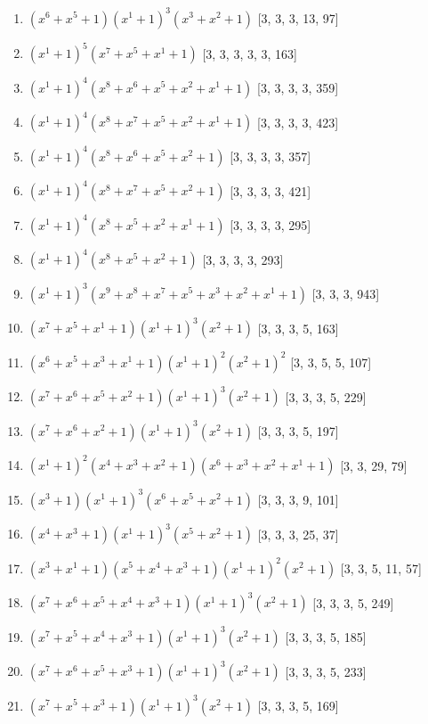\documentclass[10pt,twocolumn]{article}
\begin{document}
\begin{enumerate}
\item $(x^{6} + x^{5} + 1)(x^{1} + 1)^{3}(x^{3} + x^{2} + 1)$  [3, 3, 3, 13, 97]
\item $(x^{1} + 1)^{5}(x^{7} + x^{5} + x^{1} + 1)$  [3, 3, 3, 3, 3, 163]
\item $(x^{1} + 1)^{4}(x^{8} + x^{6} + x^{5} + x^{2} + x^{1} + 1)$  [3, 3, 3, 3, 359]
\item $(x^{1} + 1)^{4}(x^{8} + x^{7} + x^{5} + x^{2} + x^{1} + 1)$  [3, 3, 3, 3, 423]
\item $(x^{1} + 1)^{4}(x^{8} + x^{6} + x^{5} + x^{2} + 1)$  [3, 3, 3, 3, 357]
\item $(x^{1} + 1)^{4}(x^{8} + x^{7} + x^{5} + x^{2} + 1)$  [3, 3, 3, 3, 421]
\item $(x^{1} + 1)^{4}(x^{8} + x^{5} + x^{2} + x^{1} + 1)$  [3, 3, 3, 3, 295]
\item $(x^{1} + 1)^{4}(x^{8} + x^{5} + x^{2} + 1)$  [3, 3, 3, 3, 293]
\item $(x^{1} + 1)^{3}(x^{9} + x^{8} + x^{7} + x^{5} + x^{3} + x^{2} + x^{1} + 1)$  [3, 3, 3, 943]
\item $(x^{7} + x^{5} + x^{1} + 1)(x^{1} + 1)^{3}(x^{2} + 1)$  [3, 3, 3, 5, 163]
\item $(x^{6} + x^{5} + x^{3} + x^{1} + 1)(x^{1} + 1)^{2}(x^{2} + 1)^{2}$  [3, 3, 5, 5, 107]
\item $(x^{7} + x^{6} + x^{5} + x^{2} + 1)(x^{1} + 1)^{3}(x^{2} + 1)$  [3, 3, 3, 5, 229]
\item $(x^{7} + x^{6} + x^{2} + 1)(x^{1} + 1)^{3}(x^{2} + 1)$  [3, 3, 3, 5, 197]
\item $(x^{1} + 1)^{2}(x^{4} + x^{3} + x^{2} + 1)(x^{6} + x^{3} + x^{2} + x^{1} + 1)$  [3, 3, 29, 79]
\item $(x^{3} + 1)(x^{1} + 1)^{3}(x^{6} + x^{5} + x^{2} + 1)$  [3, 3, 3, 9, 101]
\item $(x^{4} + x^{3} + 1)(x^{1} + 1)^{3}(x^{5} + x^{2} + 1)$  [3, 3, 3, 25, 37]
\item $(x^{3} + x^{1} + 1)(x^{5} + x^{4} + x^{3} + 1)(x^{1} + 1)^{2}(x^{2} + 1)$  [3, 3, 5, 11, 57]
\item $(x^{7} + x^{6} + x^{5} + x^{4} + x^{3} + 1)(x^{1} + 1)^{3}(x^{2} + 1)$  [3, 3, 3, 5, 249]
\item $(x^{7} + x^{5} + x^{4} + x^{3} + 1)(x^{1} + 1)^{3}(x^{2} + 1)$  [3, 3, 3, 5, 185]
\item $(x^{7} + x^{6} + x^{5} + x^{3} + 1)(x^{1} + 1)^{3}(x^{2} + 1)$  [3, 3, 3, 5, 233]
\item $(x^{7} + x^{5} + x^{3} + 1)(x^{1} + 1)^{3}(x^{2} + 1)$  [3, 3, 3, 5, 169]

\end{enumerate}
\end{document}
